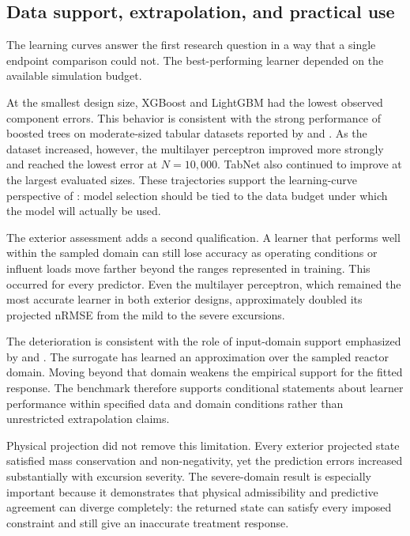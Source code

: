 \subsection{Data support, extrapolation, and practical use}

The learning curves answer the first research question in a way that a single endpoint comparison could not. The best-performing learner depended on the available simulation budget.

At the smallest design size, XGBoost and LightGBM had the lowest observed component errors. This behavior is consistent with the strong performance of boosted trees on moderate-sized tabular datasets reported by \citet{Borisov2024} and \citet{ShwartzZiv2022}. As the dataset increased, however, the multilayer perceptron improved more strongly and reached the lowest error at $N=10{,}000$. TabNet also continued to improve at the largest evaluated sizes. These trajectories support the learning-curve perspective of \citet{VieringLoog2023}: model selection should be tied to the data budget under which the model will actually be used.

The exterior assessment adds a second qualification. A learner that performs well within the sampled domain can still lose accuracy as operating conditions or influent loads move farther beyond the ranges represented in training. This occurred for every predictor. Even the multilayer perceptron, which remained the most accurate learner in both exterior designs, approximately doubled its projected nRMSE from the mild to the severe excursions.

The deterioration is consistent with the role of input-domain support emphasized by \citet{Shen2023} and \citet{Valente2025}. The surrogate has learned an approximation over the sampled reactor domain. Moving beyond that domain weakens the empirical support for the fitted response. The benchmark therefore supports conditional statements about learner performance within specified data and domain conditions rather than unrestricted extrapolation claims.

Physical projection did not remove this limitation. Every exterior projected state satisfied mass conservation and non-negativity, yet the prediction errors increased substantially with excursion severity. The severe-domain result is especially important because it demonstrates that physical admissibility and predictive agreement can diverge completely: the returned state can satisfy every imposed constraint and still give an inaccurate treatment response.

